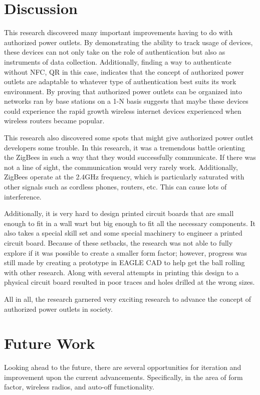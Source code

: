 \documentclass{sigchi}
\begin{document}
\section{Discussion}
This research discovered many important improvements having to do with authorized power outlets. By demonstrating the ability to track usage of devices, these devices can not only take on the role of authentication but also as instruments of data collection. Additionally, finding a way to authenticate without NFC, QR in this case, indicates that the concept of authorized power outlets are adaptable to whatever type of authentication best suits its work environment. By proving that authorized power outlets can be organized into networks ran by base stations on a 1-N basis suggests that maybe these devices could experience the rapid growth wireless internet devices experienced when wireless routers became popular. 

This research also discovered some spots that might give authorized power outlet developers some trouble. In this research, it was a tremendous battle orienting the ZigBees in such a way that they would successfully communicate. If there was not a line of sight, the communication would very rarely work. Additionally, ZigBees operate at the 2.4GHz frequency, which is particularly saturated with other signals such as cordless phones, routers, etc. This can cause lots of interference.

Additionally, it is very hard to design printed circuit boards that are small enough to fit in a wall wart but big enough to fit all the necessary components. It also takes a special skill set and some special machinery to engineer a printed circuit board. Because of these setbacks, the research was not able to fully explore if it was possible to create a smaller form factor; however, progress was still made by creating a prototype in EAGLE CAD to help get the ball rolling with other research. Along with several attempts in printing this design to a physical circuit board resulted in poor traces and holes drilled at the wrong sizes.

All in all, the research garnered very exciting research to advance the concept of authorized power outlets in society.

\section{Future Work}
Looking ahead to the future, there are several opportunities for iteration and improvement upon the current advancements. Specifically, in the area of form factor, wireless radios, and auto-off functionality.
\end{document}
